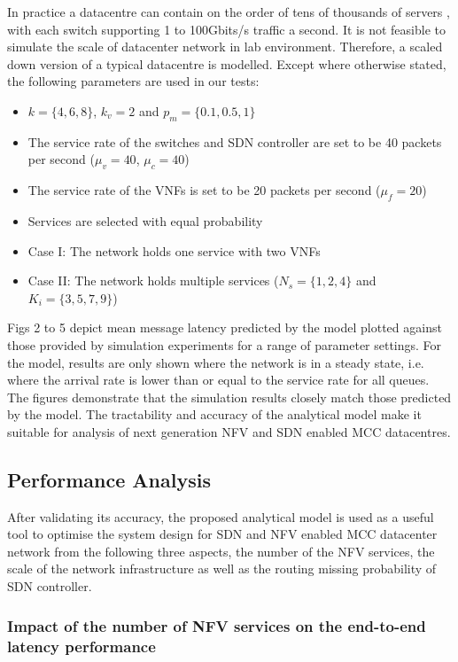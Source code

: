 In practice a datacentre can contain on the order of tens of thousands of servers \cite{AWS16}, with each switch supporting 1 to 100Gbits/s traffic a second. It is not feasible to simulate the scale of datacenter network in lab environment. Therefore, a scaled down version of a typical datacentre is modelled. Except where otherwise stated, the following parameters are used in our tests:

\begin{itemize}
	\item $k = \{4, 6, 8\}$, $k_{v} = 2$ and $p_{m} = \{0.1, 0.5, 1\}$
	\item The service rate of the switches and SDN controller are set to be 40 packets per second ($\mu_{v} = 40$, $\mu_{c} = 40$)
	\item The service rate of the VNFs is set to be 20 packets per second ($\mu_{f} = 20$)
	\item Services are selected with equal probability
	\item Case I: The network holds one service with two VNFs
	\item Case II: The network holds multiple services ($N_s = \{1,2,4\}$ and $K_i=\{3,5,7,9\}$)
\end{itemize}

Figs 2 to 5 depict mean message latency predicted by the model plotted against those provided by simulation experiments for a range of parameter settings. For the model, results are only shown where the network is in a steady state, i.e. where the arrival rate is lower than or equal to the service rate for all queues. The figures demonstrate that the simulation results closely match those predicted by the model. The tractability and accuracy of the analytical model make it suitable for analysis of next generation NFV and SDN enabled MCC datacentres.

\subsection{Performance Analysis}
After validating its accuracy, the proposed analytical model is used as a useful tool to optimise the system design for SDN and NFV enabled MCC datacenter network from the following three aspects, the number of the NFV services, the scale of the network infrastructure as well as the routing missing probability of SDN controller.

\subsubsection{Impact of the number of NFV services on the end-to-end latency performance}

